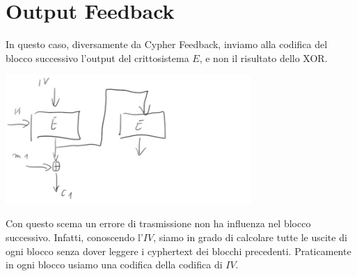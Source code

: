 \section{Output Feedback}
In questo caso, diversamente da Cypher Feedback, inviamo alla codifica del blocco successivo l'output del crittosistema $E$, e non il risultato dello XOR.

\begin{center}
    \includegraphics[width=0.7\textwidth]{images/OF.png}
\end{center}

\noindent Con questo scema un errore di trasmissione non ha influenza nel blocco successivo. Infatti, conoscendo l'$IV$, siamo in grado di calcolare tutte le uscite di ogni blocco senza dover leggere i cyphertext dei blocchi precedenti. Praticamente in ogni blocco usiamo una codifica della codifica di $IV$.